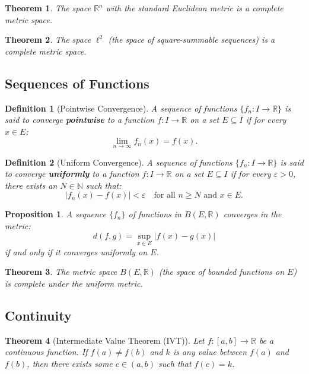 \documentclass{article}
\newtheorem{definition}{Definition}
\newtheorem{proposition}{Proposition}
\newtheorem{theorem}{Theorem}
\begin{document}
\begin{theorem}
The space $\mathbb{R}^n$ with the standard Euclidean metric is a complete metric space.
\end{theorem}

\begin{theorem}
The space $\ell^2$ (the space of square-summable sequences) is a complete metric space.
\end{theorem}

\subsection*{Sequences of Functions}

\begin{definition}[Pointwise Convergence]
A sequence of functions $\{f_n : I \to \mathbb{R}\}$ is said to converge \textbf{pointwise} to a function $f : I \to \mathbb{R}$ on a set $E \subseteq I$ if for every $x \in E$:
\[
\lim_{n \to \infty} f_n(x) = f(x).
\]
\end{definition}

\begin{definition}[Uniform Convergence]
A sequence of functions $\{f_n : I \to \mathbb{R}\}$ is said to converge \textbf{uniformly} to a function $f : I \to \mathbb{R}$ on a set $E \subseteq I$ if for every $\varepsilon > 0$, there exists an $N \in \mathbb{N}$ such that:
\[
|f_n(x) - f(x)| < \varepsilon \quad \text{for all } n \geq N \text{ and } x \in E.
\]
\end{definition}

\begin{proposition}
A sequence $\{f_n\}$ of functions in $B(E, \mathbb{R})$ converges in the metric:
\[
d(f, g) = \sup_{x \in E} |f(x) - g(x)|
\]
if and only if it converges uniformly on $E$.
\end{proposition}

\begin{theorem}
The metric space $B(E, \mathbb{R})$ (the space of bounded functions on $E$) is complete under the uniform metric.
\end{theorem}


\subsection*{Continuity}


\begin{theorem}[Intermediate Value Theorem (IVT)]
Let $f : [a, b] \to \mathbb{R}$ be a continuous function. If $f(a) \neq f(b)$ and $k$ is any value between $f(a)$ and $f(b)$, then there exists some $c \in (a, b)$ such that $f(c) = k$.
\end{theorem}
\end{document}
